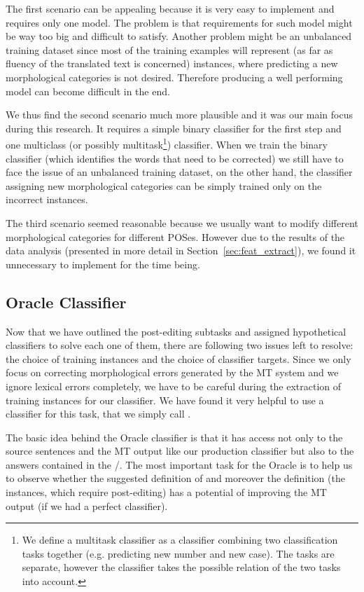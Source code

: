 The first scenario can be appealing because it is very easy to implement and requires only one model.
The problem is that requirements for such model might be way too big and difficult to satisfy. Another
problem might be an unbalanced training dataset since most of the training examples will represent
 (as far as fluency of the translated text is concerned)
instances, where predicting a new morphological categories is not desired. Therefore
producing a well performing model can become difficult in the end.

We thus find the second scenario much more plausible and it was our main focus during this research.
It requires a simple binary classifier for the first step and one multiclass (or possibly multitask\footnote{We
define a multitask classifier as a classifier combining two classification tasks together (e.g. predicting new number and new case).
The tasks are separate, however the classifier takes the possible relation of the two tasks into account.}) classifier.
When we train the binary classifier (which identifies the words that need to be corrected) we still have to face
the issue of an unbalanced training dataset, on the other hand, the classifier assigning new morphological categories
can be simply trained only on the incorrect instances.

The third scenario seemed reasonable because we usually want to modify different morphological categories for different POSes.
However due to the results of the data analysis (presented in more detail in Section~\ref{sec:feat_extract}), we found it unnecessary to implement for the time being.

\subsection{Oracle Classifier}

Now that we have outlined the post-editing subtasks and assigned hypothetical classifiers 
to solve each one of them, there are following two issues left to resolve: the choice of
training instances and the choice of classifier targets. Since we only focus on correcting morphological
errors generated by the MT system and we ignore lexical errors completely, we have to be careful
during the extraction of training instances for our classifier. We have found it very helpful to
use a  classifier for this task, that we simply call .

The basic idea behind the Oracle classifier is that it has access not only to the
source sentences and the MT output like our production classifier but also to the  answers
contained in the /. The most important
task for the Oracle is to help us to observe whether the suggested definition of  and
moreover the definition  (the instances, which require post-editing)
has a potential of improving the MT output (if we had a perfect classifier).


